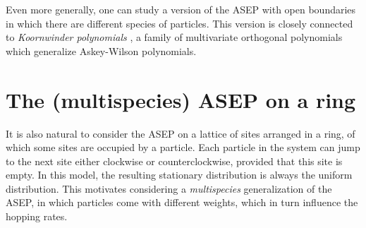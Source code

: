 \documentclass[11pt]{amsart}
\theoremstyle{definition}
\theoremstyle{remark}
\begin{document}
Even more generally, one can study a version of the ASEP
with open boundaries in which there are different species
of particles.  This version is closely connected 
\cite{Cantini, CW5, CantiniGarbali}
to 
\emph{Koornwinder polynomials}  \cite{Koornwinder},
a family of multivariate orthogonal polynomials
which generalize Askey-Wilson polynomials.

\section{The (multispecies) ASEP on a ring}

It is also natural to consider the ASEP on
a lattice of 
 sites arranged in a ring, of which some sites
are occupied by a particle.  Each particle in the system can
jump to the next site either clockwise or counterclockwise,
provided that this site is empty.
In this model, %
the resulting stationary distribution
is always the uniform distribution.   This motivates 
considering a \emph{multispecies} generalization of the ASEP,
in which particles come with different weights, which in 
turn influence the hopping rates.


\end{document}
